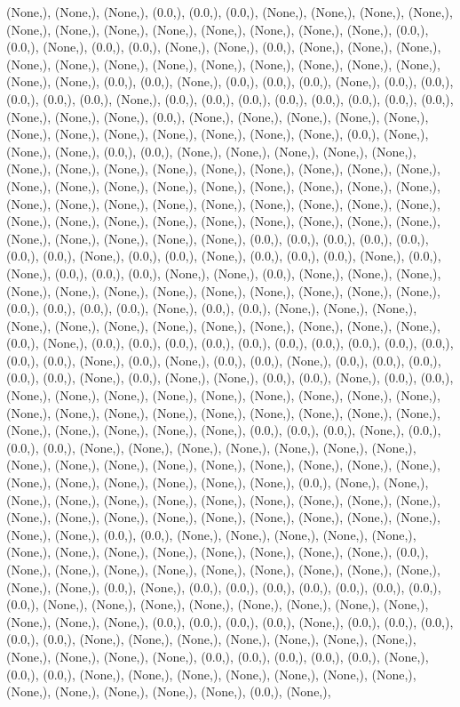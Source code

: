 \documentclass{article}
\begin{document}
(None,), (None,), (None,), (0.0,), (0.0,), (0.0,), (None,), (None,), (None,), (None,), (None,), (None,), (None,), (None,), (None,), (None,), (None,), (None,), (0.0,), (0.0,), (None,), (0.0,), (0.0,), (None,), (None,), (0.0,), (None,), (None,), (None,), (None,), (None,), (None,), (None,), (None,), (None,), (None,), (None,), (None,), (None,), (None,), (0.0,), (0.0,), (None,), (0.0,), (0.0,), (0.0,), (None,), (0.0,), (0.0,), (0.0,), (0.0,), (0.0,), (None,), (0.0,), (0.0,), (0.0,), (0.0,), (0.0,), (0.0,), (0.0,), (0.0,), (None,), (None,), (None,), (0.0,), (None,), (None,), (None,), (None,), (None,), (None,), (None,), (None,), (None,), (None,), (None,), (None,), (0.0,), (None,), (None,), (None,), (0.0,), (0.0,), (None,), (None,), (None,), (None,), (None,), (None,), (None,), (None,), (None,), (None,), (None,), (None,), (None,), (None,), (None,), (None,), (None,), (None,), (None,), (None,), (None,), (None,), (None,), (None,), (None,), (None,), (None,), (None,), (None,), (None,), (None,), (None,), (None,), (None,), (None,), (None,), (None,), (None,), (None,), (None,), (None,), (None,), (None,), (None,), (None,), (None,), (0.0,), (0.0,), (0.0,), (0.0,), (0.0,), (0.0,), (0.0,), (None,), (0.0,), (0.0,), (None,), (0.0,), (0.0,), (0.0,), (None,), (0.0,), (None,), (0.0,), (0.0,), (0.0,), (None,), (None,), (0.0,), (None,), (None,), (None,), (None,), (None,), (None,), (None,), (None,), (None,), (None,), (None,), (None,), (0.0,), (0.0,), (0.0,), (0.0,), (None,), (0.0,), (0.0,), (None,), (None,), (None,), (None,), (None,), (None,), (None,), (None,), (None,), (None,), (None,), (None,), (0.0,), (None,), (0.0,), (0.0,), (0.0,), (0.0,), (0.0,), (0.0,), (0.0,), (0.0,), (0.0,), (0.0,), (0.0,), (0.0,), (None,), (0.0,), (None,), (0.0,), (0.0,), (None,), (0.0,), (0.0,), (0.0,), (0.0,), (0.0,), (None,), (0.0,), (None,), (None,), (0.0,), (0.0,), (None,), (0.0,), (0.0,), (None,), (None,), (None,), (None,), (None,), (None,), (None,), (None,), (None,), (None,), (None,), (None,), (None,), (None,), (None,), (None,), (None,), (None,), (None,), (None,), (None,), (None,), (None,), (0.0,), (0.0,), (0.0,), (None,), (0.0,), (0.0,), (0.0,), (None,), (None,), (None,), (None,), (None,), (None,), (None,), (None,), (None,), (None,), (None,), (None,), (None,), (None,), (None,), (None,), (None,), (None,), (None,), (None,), (None,), (None,), (0.0,), (None,), (None,), (None,), (None,), (None,), (None,), (None,), (None,), (None,), (None,), (None,), (None,), (None,), (None,), (None,), (None,), (None,), (None,), (None,), (None,), (None,), (None,), (0.0,), (0.0,), (None,), (None,), (None,), (None,), (None,), (None,), (None,), (None,), (None,), (None,), (None,), (None,), (None,), (0.0,), (None,), (None,), (None,), (None,), (None,), (None,), (None,), (None,), (None,), (None,), (None,), (0.0,), (None,), (0.0,), (0.0,), (0.0,), (0.0,), (0.0,), (0.0,), (0.0,), (0.0,), (None,), (None,), (None,), (None,), (None,), (None,), (None,), (None,), (None,), (None,), (None,), (0.0,), (0.0,), (0.0,), (0.0,), (None,), (0.0,), (0.0,), (0.0,), (0.0,), (0.0,), (None,), (None,), (None,), (None,), (None,), (None,), (None,), (None,), (None,), (None,), (None,), (0.0,), (0.0,), (0.0,), (0.0,), (0.0,), (None,), (0.0,), (0.0,), (None,), (None,), (None,), (None,), (None,), (None,), (None,), (None,), (None,), (None,), (None,), (None,), (0.0,), (None,), 
\end{document}
